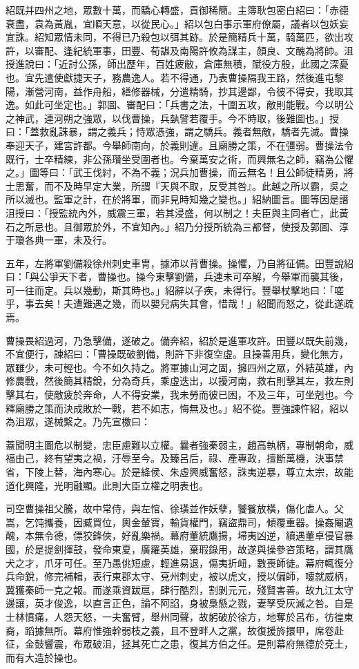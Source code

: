 \begin{pinyinscope}
紹既并四州之地，眾數十萬，而驕心轉盛，貢御稀簡。主簿耿包密白紹曰：「赤德衰盡，袁為黃胤，宜順天意，以從民心。」紹以包白事示軍府僚屬，議者以包妖妄宜誅。紹知眾情未同，不得已乃殺包以弭其跡。於是簡精兵十萬，騎萬匹，欲出攻許，以審配、逢紀統軍事，田豐、荀諶及南陽許攸為謀主，顏良、文醜為將帥。沮授進說曰：「近討公孫，師出歷年，百姓疲敝，倉庫無積，賦役方殷，此國之深憂也。宜先遣使獻捷天子，務農逸人。若不得通，乃表曹操隔我王路，然後進屯黎陽，漸營河南，益作舟船，繕修器械，分遣精騎，抄其邊鄙，令彼不得安，我取其逸。如此可坐定也。」郭圖、審配曰：「兵書之法，十圍五攻，敵則能戰。今以明公之神武，連河朔之強眾，以伐曹操，兵埶譬若覆手。今不時取，後難圖也。」授曰：「蓋救亂誅暴，謂之義兵；恃眾憑強，謂之驕兵。義者無敵，驕者先滅。曹操奉迎天子，建宮許都。今舉師南向，於義則違。且廟勝之策，不在彊弱。曹操法令既行，士卒精練，非公孫瓚坐受圍者也。今棄萬安之術，而興無名之師，竊為公懼之。」圖等曰：「武王伐紂，不為不義；況兵加曹操，而云無名！且公師徒精勇，將士思奮，而不及時早定大業，所謂『天與不取，反受其咎』。此越之所以霸，吳之所以滅也。監軍之計，在於將軍，而非見時知幾之變也。」紹納圖言。圖等因是譖沮授曰：「授監統內外，威震三軍，若其浸盛，何以制之！夫臣與主同者亡，此黃石之所忌也。且御眾於外，不宜知內。」紹乃分授所統為三都督，使授及郭圖、淳于瓊各典一軍，未及行。

五年，左將軍劉備殺徐州刺史車冑，據沛以背曹操。操懼，乃自將征備。田豐說紹曰：「與公爭天下者，曹操也。操今東擊劉備，兵連未可卒解，今舉軍而襲其後，可一往而定。兵以幾動，斯其時也。」紹辭以子疾，未得行。豐舉杖擊地曰：「嗟乎，事去矣！夫遭難遇之幾，而以嬰兒病失其會，惜哉！」紹聞而怒之，從此遂疏焉。

曹操畏紹過河，乃急擊備，遂破之。備奔紹，紹於是進軍攻許。田豐以既失前幾，不宜便行，諫紹曰：「曹操既破劉備，則許下非復空虛。且操善用兵，變化無方，眾雖少，未可輕也。今不如久持之。將軍據山河之固，擁四州之眾，外結英雄，內修農戰，然後簡其精銳，分為奇兵，乘虛迭出，以擾河南，救右則擊其左，救左則擊其右，使敵疲於奔命，人不得安業，我未勞而彼已困，不及三年，可坐剋也。今釋廟勝之策而決成敗於一戰，若不如志，悔無及也。」紹不從。豐強諫忤紹，紹以為沮眾，遂械繫之。乃先宣檄曰：

蓋聞明主圖危以制變，忠臣慮難以立權。曩者強秦弱主，趙高執柄，專制朝命，威福由己，終有望夷之禍，汙辱至今。及臻呂后，祿、產專政，擅斷萬機，決事禁省，下陵上替，海內寒心。於是絳侯、朱虛興威奮怒，誅夷逆暴，尊立太宗，故能道化興隆，光明融顯。此則大臣立權之明表也。

司空曹操祖父騰，故中常侍，與左悺、徐璜並作妖孽，饕餮放橫，傷化虐人。父嵩，乞饨攜養，因臧買位，輿金輦寶，輸貨權門，竊盜鼎司，傾覆重器。操姦閹遺醜，本無令德，僄狡鋒俠，好亂樂禍。幕府董統鷹揚，埽夷凶逆，續遇董卓侵官暴國，於是提劍揮鼓，發命東夏，廣羅英雄，棄瑕錄用，故遂與操參咨策略，謂其鷹犬之才，爪牙可任。至乃愚佻短慮，輕進易退，傷夷折衄，數喪師徒。幕府輒復分兵命銳，修完補輯，表行東郡太守、兗州刺史，被以虎文，授以偏師，嚔就威柄，冀獲秦師一克之報。而遂乘資跋扈，肆行酷烈，割剝元元，殘賢害善。故九江太守邊讓，英才俊逸，以直言正色，論不阿諂，身被梟懸之戮，妻孥受灰滅之咎。自是士林憤痛，人怨天怒，一夫奮臂，舉州同聲，故躬破於徐方，地奪於呂布，彷徨東裔，蹈據無所。幕府惟強幹弱枝之義，且不登畔人之黨，故復援旍擐甲，席卷赴征，金鼓響震，布眾破沮，拯其死亡之患，復其方伯之任。是則幕府無德於兗土，而有大造於操也。


\end{pinyinscope}
